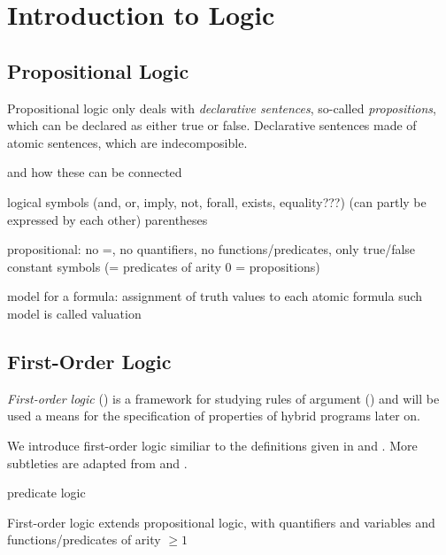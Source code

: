 \chapter{Introduction to Logic}
    \label{sec:introduction-logic}

    \section{Propositional Logic}
        \label{sec:propositional-logic}

        \cite{Huth04LogicInCS}


        Propositional logic only deals with \textit{declarative sentences}, so-called \textit{propositions}, which can be declared as either true or false.
        Declarative sentences made of atomic sentences, which are indecomposible.


        and how these can be connected


        logical symbols (and, or, imply, not, forall, exists, equality???) (can partly be expressed by each other)
        parentheses


        propositional: no =, no quantifiers, no functions/predicates, only true/false constant symbols (= predicates of arity 0 = propositions)

        model for a formula: assignment of truth values to each atomic formula
        such model is called valuation


    \section{First-Order Logic}
        \label{sec:first-order-logic}

        \textit{First-order logic} (\FOL) is a framework for studying rules of argument (\cite{Hodges01ClassicalLogic}) and will be used a means for the specification of properties of hybrid programs later on.

        We introduce first-order logic similiar to the definitions given in \cite{Platzer10HybridSystems} and \cite{Huth04LogicInCS}. More subtleties are adapted from \cite{Hodges01ClassicalLogic} and \cite{Rautenberg10ConciseLogic}.


        predicate logic

        First-order logic extends propositional logic,
        with quantifiers
        and variables
        and functions/predicates of arity $\geq 1$

